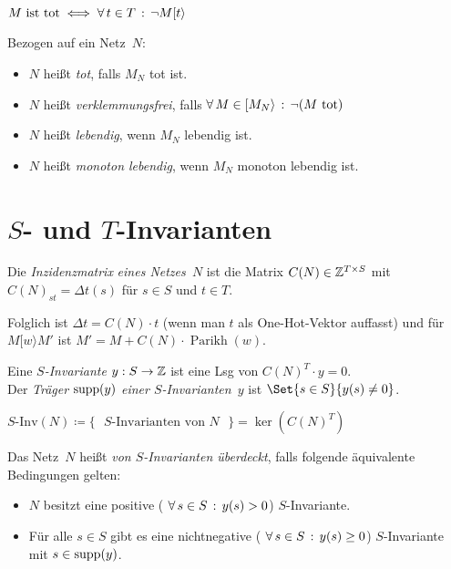 \documentclass{cheat-sheet}
\newcommand{\activeTransition}[1]{[{#1}\rangle} %
\DeclareMathOperator{\Parikh}{Parikh} %
\newcommand{\SInv}{S\text{-}\mathrm{Inv}} %
\begin{document}
\begin{bem}
  $M \text{ ist tot} \iff \fa{t \in T} \neg M \activeTransition{t}$
\end{bem}

\begin{defn}
  Bezogen auf ein Netz~$N$:
  \begin{itemize}
    \item $N$ heißt \textit{tot}, falls $M_N$ tot ist.
    \item $N$ heißt \emph{verklemmungsfrei}, falls $\fa{M \in \activeTransition{M_N}} \neg (M \text{ tot})$
    \item $N$ heißt \textit{lebendig}, wenn $M_N$ lebendig ist.
    \item $N$ heißt \textit{monoton lebendig}, wenn $M_N$ monoton lebendig ist.
  \end{itemize}
\end{defn}

\section{$S$- und $T$-Invarianten}


\begin{defn}
  Die \emph{Inzidenzmatrix} \textit{eines Netzes~$N$} ist die Matrix $C(N) \in \mathbb{Z}^{T \times S}$ mit $C(N)_{s t} = \Delta t (s)$ für $s \in S$ und $t \in T$.
\end{defn}

\begin{bem}
  Folglich ist $\Delta t = C(N) \cdot t$ (wenn man $t$ als One-Hot-Vektor auffasst) und für $M \activeTransition{w} M'$ ist $M' = M + C(N) \cdot \Parikh(w)$.
\end{bem}

\begin{defn}
  Eine \emph{$S$-Invariante} $y : S \to \mathbb{Z}$ ist eine Lsg von $C(N)^T \cdot y = 0$. \\
  Der \emph{Träger} $\operatorname{supp}(y)$ \textit{einer $S$-Invarianten~$y$} ist $\Set{s \in S}{y(s) \neq 0}$. \\
\end{defn}

\begin{nota}
  $\SInv(N) \coloneqq \{ \text{ $S$-Invarianten von~$N$ } \} = \ker(C(N)^T)$
\end{nota}

\begin{lemdefn}
  Das Netz~$N$ heißt \emph{von $S$-Invarianten überdeckt}, falls folgende äquivalente Bedingungen gelten:
  \begin{itemize}
    \item $N$ besitzt eine positive (\dh{} $\forall \, {s \in S} \,:\, y(s) > 0$) $S$-Invariante.
    \item Für alle $s \in S$ gibt es eine nichtnegative (\dh{} $\forall \, {s \in S} \,:\, y(s) \geq 0$) $S$-Invariante mit $s \in \operatorname{supp}(y)$.
  \end{itemize}
\end{lemdefn}
\end{document}
